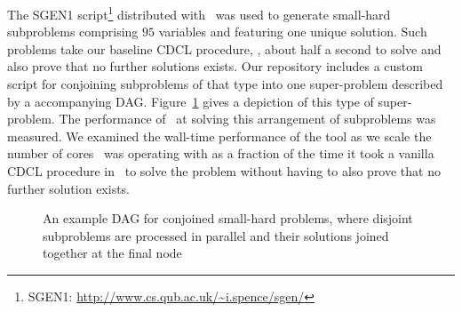 \documentclass[
10pt, %
a4paper, %
oneside, %
headinclude,footinclude, %
BCOR5mm, %
]{scrartcl}
\begin{document}
The SGEN1 script\footnote{SGEN1: \url{http://www.cs.qub.ac.uk/~i.spence/sgen/}} distributed with \dagster\ was used to generate small-hard subproblems comprising $95$ variables and featuring one unique solution.
Such problems take our baseline CDCL procedure, \tinisat, about half a second to solve and also prove that no further solutions exists.
Our repository includes a custom script for conjoining subproblems of that type into one super-problem described by a accompanying DAG.
Figure~\ref{fig:dag_example4315} gives a depiction of this type of super-problem.
The performance of \dagster\ at solving this arrangement of subproblems was measured.
We examined the wall-time performance of the tool as we scale the number of cores \dagster\ was operating with as a fraction of the time it took a vanilla CDCL procedure in \tinisat\ to solve the problem without having to also prove that no further solution exists.


\begin{figure}[h]
\centering
{}
\caption[An example DAG for conjoined small-hard problems]{An example DAG for conjoined small-hard problems, where disjoint subproblems are processed in parallel and their solutions joined together at the final node}\label{fig:dag_example4315}
\end{figure}
\end{document}
